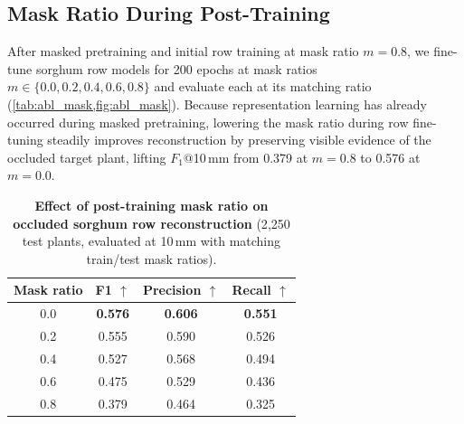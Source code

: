 \documentclass[10pt,twocolumn,letterpaper]{article}
\begin{document}
\subsection{Mask Ratio During Post-Training}
\label{sec:abl_mask}

After masked pretraining and initial row training at mask ratio $m = 0.8$, we fine-tune sorghum row models for 200 epochs at mask ratios $m \in \{0.0, 0.2, 0.4, 0.6, 0.8\}$ and evaluate each at its matching ratio (\cref{tab:abl_mask,fig:abl_mask}). Because representation learning has already occurred during masked pretraining, lowering the mask ratio during row fine-tuning steadily improves reconstruction by preserving visible evidence of the occluded target plant, lifting $F_1$@10\,mm from 0.379 at $m = 0.8$ to 0.576 at $m = 0.0$.

\begin{table}[t]
  \caption{\textbf{Effect of post-training mask ratio on occluded sorghum row reconstruction} (2{,}250 test plants, evaluated at 10\,mm with matching train/test mask ratios).}
  \label{tab:abl_mask}
  \centering\small
  \begin{tabular}{@{}cccc@{}}
    \toprule
    Mask ratio & F1 $\uparrow$ & Precision $\uparrow$ & Recall $\uparrow$ \\
    \midrule
    0.0 & \textbf{0.576} & \textbf{0.606} & \textbf{0.551} \\
    0.2 & 0.555 & 0.590 & 0.526 \\
    0.4 & 0.527 & 0.568 & 0.494 \\
    0.6 & 0.475 & 0.529 & 0.436 \\
    0.8 & 0.379 & 0.464 & 0.325 \\
    \bottomrule
  \end{tabular}
\end{table}
\end{document}

